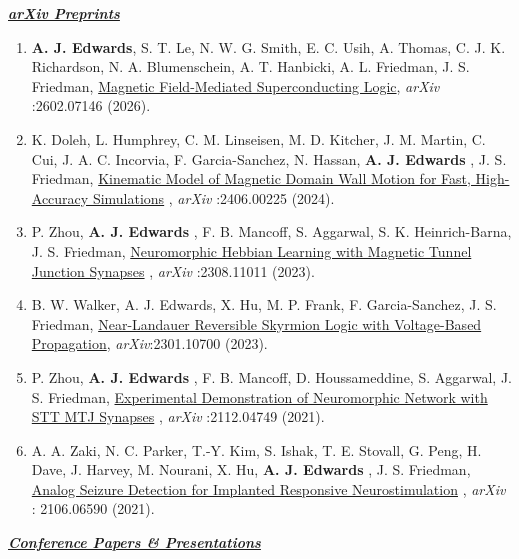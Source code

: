\documentclass[12pt]{article}
\begin{document}
{\large \textit{\textbf{\ul{arXiv Preprints}}}}

\begin{enumerate}
\item \textbf{A. J. Edwards}, S. T. Le, N. W. G. Smith, E. C. Usih, A. Thomas, C. J. K. Richardson, N. A. Blumenschein, A. T. Hanbicki, A. L. Friedman, J. S. Friedman, \href{https://arxiv.org/abs/2602.07146}{Magnetic Field-Mediated Superconducting Logic}, \textit{arXiv} :2602.07146 (2026).
\item K. Doleh, L. Humphrey, C. M. Linseisen, M. D. Kitcher, J. M. Martin, C. Cui, J. A. C. Incorvia, F. Garcia-Sanchez, N. Hassan, \textbf{A. J. Edwards} , J. S. Friedman, \href{https://arxiv.org/abs/2406.00225}{Kinematic Model of Magnetic Domain Wall Motion for Fast, High-Accuracy Simulations} , \textit{arXiv} :2406.00225 (2024).
\item P. Zhou, \textbf{A. J. Edwards} , F. B. Mancoff, S. Aggarwal, S. K. Heinrich-Barna, J. S. Friedman, \href{https://arxiv.org/abs/2308.11011}{Neuromorphic Hebbian Learning with Magnetic Tunnel Junction Synapses} , \textit{arXiv} :2308.11011 (2023).
\item B. W. Walker, A. J. Edwards, X. Hu, M. P. Frank, F. Garcia-Sanchez, J. S. Friedman, \href{https://arxiv.org/abs/2301.10700}{Near-Landauer Reversible Skyrmion Logic with Voltage-Based Propagation}, \textit{arXiv}:2301.10700 (2023).
\item P. Zhou, \textbf{A. J. Edwards} , F. B. Mancoff, D. Houssameddine, S. Aggarwal, J. S. Friedman, \href{https://arxiv.org/abs/2112.04749}{Experimental Demonstration of Neuromorphic Network with STT MTJ Synapses} , \textit{arXiv} :2112.04749 (2021).
\item A. A. Zaki, N. C. Parker, T.-Y. Kim, S. Ishak, T. E. Stovall, G. Peng, H. Dave, J. Harvey, M. Nourani, X. Hu, \textbf{A. J. Edwards} , J. S. Friedman, \href{https://arxiv.org/abs/2106.06590}{Analog Seizure Detection for Implanted Responsive Neurostimulation} , \textit{arXiv} : 2106.06590 (2021).

\end{enumerate}

{\large \textit{\textbf{\ul{Conference Papers \& Presentations}}}}
\end{document}
